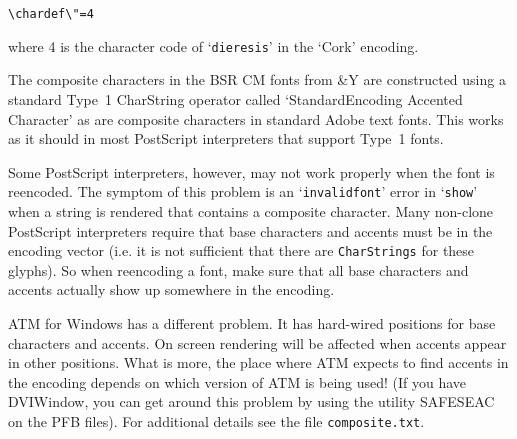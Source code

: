 \verb|\chardef\"=4|

\noindent
where 4 is the character code of `{\tt dieresis}' in the `Cork' encoding.


The composite characters in the BSR CM fonts from {\Y&Y} 
are constructed using a standard Type~1 Char\-String operator called
`StandardEncoding Accented Character' %
as are %
composite characters in standard Adobe text fonts.
This works as it should in most PostScript interpreters that support Type~1
fonts. %

Some PostScript interpreters, however, 
may not work properly when the font is reencoded.  
The symptom of this problem is an `{\tt invalidfont}' error in `{\tt show}' 
when a string is rendered that contains a composite character.
%
Many non-clone PostScript interpreters require that base characters and accents
must be in the encoding vector (i.e. it is not sufficient that there are 
{\tt Char\-Strings} for these glyphs).  So when reencoding a font, make
sure that all base characters and accents actually show up somewhere
in the encoding.

ATM for Windows has a different problem.  It has hard-wired positions
for base characters and accents.  On screen rendering will be affected
when accents appear in other positions.  
What is more, the place where ATM expects to find accents in the encoding
depends on which version of ATM is being used! %
(If you have DVI\-Window, you can get around this problem by using the
utility SAFESEAC on the PFB files).
%
%
%
For additional details see the file {\tt composite.txt}.

